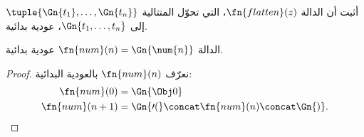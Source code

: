 \documentclass[../../../include/open-logic-section]{subfiles}
\begin{document}
\begin{prob}
أثبت أن الدالة $\fn{flatten}(z)$، التي تحوّل المتتالية
$\tuple{\Gn{t_1}, \dots, \Gn{t_n}}$ إلى $\Gn{t_1, \dots, t_n}$، عودية
بدائية.
\end{prob}

\begin{prop}
  الدالة $\fn{num}(n)=\Gn{\num{n}}$ عودية بدائية.
\end{prop}

\begin{proof}
  نعرّف $\fn{num}(n)$ بالعودية البدائية:
  \begin{align*}
    \fn{num}(0) & = \Gn{\Obj 0}\\
    \fn{num}(n+1) & = \Gn{\prime(} \concat \fn{num}(n) \concat \Gn{)}.
  \end{align*}
\end{proof}
\end{document}
